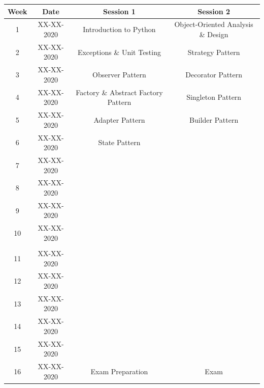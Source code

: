 \documentclass{article}
\begin{document}
\renewcommand{\arraystretch}{1.5}
\begin{tabular}{|c|c|c|c|}
	\hline
	\textbf{Week} & \textbf{Date} & \textbf{Session 1}                  & \textbf{Session 2}                 \\ \hline
	1             & XX-XX-2020    & Introduction to Python              & Object-Oriented Analysis \& Design \\ \hline
	2             & XX-XX-2020    & Exceptions \& Unit Testing          & Strategy Pattern                   \\ \hline
	3             & XX-XX-2020    & Observer Pattern                    & Decorator Pattern                  \\ \hline
	4             & XX-XX-2020    & Factory \& Abstract Factory Pattern & Singleton  Pattern                 \\ \hline
	5             & XX-XX-2020    & Adapter Pattern                     & Builder Pattern                    \\ \hline
	6             & XX-XX-2020    & State Pattern                       &                                    \\ \hline
	7             & XX-XX-2020    &                                     &                                    \\ \hline
	8             & XX-XX-2020    &                                     &                                    \\ \hline
	9             & XX-XX-2020    &                                     &                                    \\ \hline
	10            & XX-XX-2020    &                                     &                                    \\ \hline
	\rowcolor{yellow} \multicolumn{4}{|c|}{Mid Term Break}                                                      \\ \hline
	11            & XX-XX-2020    &                                     &                                    \\ \hline
	12            & XX-XX-2020    &                                     &                                    \\ \hline
	13            & XX-XX-2020    &                                     &                                    \\ \hline
	14            & XX-XX-2020    &                                     &                                    \\ \hline
	15            & XX-XX-2020    &                                     &                                    \\ \hline
	16            & XX-XX-2020    & Exam Preparation                    & Exam                               \\ \hline
\end{tabular}
\end{document}
